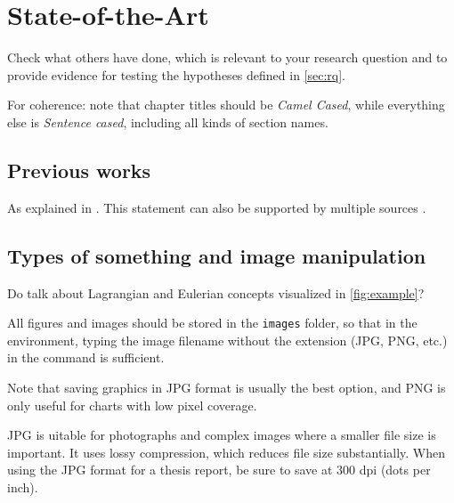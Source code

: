 \chapter{State-of-the-Art}
\label{ch:soa}


Check what others have done, which is relevant to your research question and to provide evidence for testing the hypotheses defined in \autoref{sec:rq}.

For coherence: note that chapter titles should be \textit{Camel Cased}, while everything else is \textit{Sentence cased}, including all kinds of section names.

\section{Previous works}
\label{sec:prevworks}
	
As explained in . This statement can also be supported by multiple sources \cite{schwindt2019lifespan, schwindt2023bayesian, schwindt2023bedload, scolari2025hydromorphodynamic}.

	
\section{Types of something and image manipulation}
\label{sec:typesome}

Do  talk about Lagrangian and Eulerian concepts visualized in \autoref{fig:example}?

All figures and images should be stored in the \texttt{images} folder, so that in the  environment, typing the image filename without the extension (JPG, PNG, etc.) in the  command is sufficient.

Note that saving graphics in JPG format is usually the best option, and PNG is only useful for charts with low pixel coverage.

JPG is uitable for photographs and complex images where a smaller file size is important. It uses lossy compression, which reduces file size substantially. When using the JPG format for a thesis report, be sure to save at 300 dpi (dots per inch).

